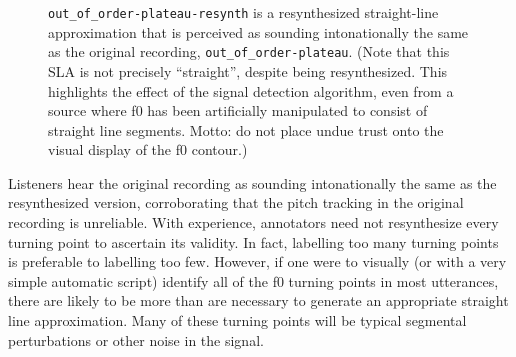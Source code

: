 \documentclass[11pt, twoside]{memoir}
\begin{document}
{{\begin{figure}[H]
\caption[\texttt{out\_of\_order-plateau-resynth} is a resynthesized straight-line approximation that is perceived as sounding intonationally the same as the original recording, \texttt{out\_of\_order-plateau}.]{\texttt{out\_of\_order-plateau-resynth} is a resynthesized straight-line approximation that is perceived as sounding intonationally the same as the original recording, \texttt{out\_of\_order-plateau}. (Note that this SLA is not precisely “straight”, despite being resynthesized. This highlights the effect of the signal detection algorithm, even from a source where f0 has been artificially manipulated to consist of straight line segments. Motto: do not place undue trust onto the visual display of the f0 contour.)
\label{fig:out_of_order-plateau Points basic resynth}
}
\end{figure}
Listeners hear the original recording as sounding intonationally the same as the resynthesized version, corroborating that the pitch tracking in the original recording is unreliable.
With experience, annotators need not resynthesize every turning point to ascertain its validity. In fact, labelling too many turning points is preferable to labelling too few. However, if one were to visually (or with a very simple automatic script) identify all of the f0 turning points in most utterances, there are likely to be more than are necessary to generate an appropriate straight line approximation. Many of these turning points will be typical segmental perturbations or other noise in the signal.
}}
\end{document}
